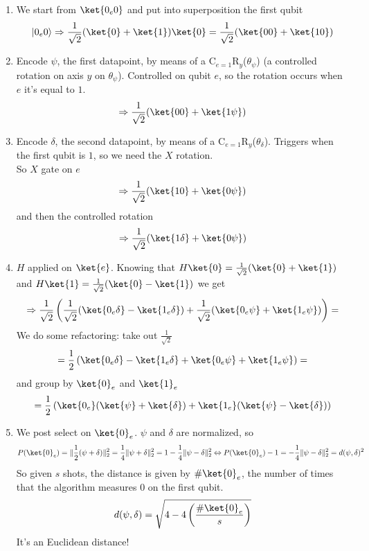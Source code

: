 \documentclass[10pt]{report}
\begin{document}
\begin{enumerate}
	\item We start from $\ket{0_e0}$ and put into superposition the first qubit
	$$|0_e0\rangle \Rightarrow \frac{1}{\sqrt{2}}(\ket{0}+\ket{1})\ket{0} = \frac{1}{\sqrt{2}}(\ket{00}+\ket{10})$$
	\item Encode $\psi$, the first datapoint, by means of a C$_{e=1}$R$_y$($\theta_\psi$) (a controlled rotation on axis $y$ on $\theta_\psi$). Controlled on qubit $e$, so the rotation occurs when $e$ it's equal to $1$.
	$$\Rightarrow \frac{1}{\sqrt{2}}(\ket{00}+\ket{1\psi})$$
	\item Encode $\delta$, the second datapoint, by means of a C$_{e=1}$R$_y$($\theta_\delta$). Triggers when the first qubit is $1$, so we need the $X$ rotation.\\
	So $X$ gate on $e$
	$$\Rightarrow \frac{1}{\sqrt{2}}(\ket{10}+\ket{0\psi})$$
	and then the controlled rotation
	$$\Rightarrow \frac{1}{\sqrt{2}}(\ket{1\delta}+\ket{0\psi})$$
	\item $H$ applied on $\ket{e}$. Knowing that $H\ket{0} = \frac{1}{\sqrt{2}}(\ket{0} + \ket{1})$ and $H\ket{1} = \frac{1}{\sqrt{2}}(\ket{0} - \ket{1})$ we get
	$$\Rightarrow \frac{1}{\sqrt{2}}\left(\frac{1}{\sqrt{2}}(\ket{0_e\delta}-\ket{1_e\delta})+\frac{1}{\sqrt{2}}(\ket{0_e\psi} + \ket{1_e\psi})\right) =$$
	We do some refactoring: take out $\frac{1}{\sqrt{2}}$
	$$= \frac{1}{2}\left(\ket{0_e\delta}-\ket{1_e\delta} + \ket{0_e\psi} + \ket{1_e\psi}\right) =$$
	and group by $\ket{0}_e$ and $\ket{1}_e$
	$$= \frac{1}{2}\left(\ket{0_e}(\ket{\psi}+\ket{\delta}) + \ket{1_e}(\ket{\psi}-\ket{\delta})\right)$$
	\item We post select on $\ket{0}_e$. $\psi$ and $\delta$ are normalized, so
	$$P(\ket{0}_e) = \|\frac{1}{2}(\psi+\delta)\|_2^2 = \frac{1}{4}\|\psi + \delta\|_2^2  = 1-\frac{1}{4}\|\psi-\delta\|_2^2 \Leftrightarrow P(\ket{0}_e)-1 = -\frac{1}{4}\|\psi-\delta\|_2^2 = d(\psi, \delta)^2$$
	So given $s$ shots, the distance is given by $\#\ket{0}_e$, the number of times that the algorithm measures $0$ on the first qubit.
	$$d(\psi,\delta) = \sqrt{4- 4\left(\frac{\#\ket{0}_e}{s}\right)}$$
	It's an Euclidean distance!
\end{enumerate}
\end{document}
